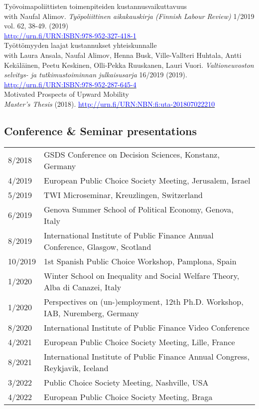 \documentclass[16pt]{article}
\begin{document}
\noindent Ty\"{o}voimapoliittisten toimenpiteiden kustannusvaikuttavuus \\
\noindent with Naufal Alimov. \textit{Ty\"{o}poliittinen aikakauskirja (Finnish Labour Review)} 1/2019 vol. 62, 38-49.  (2019) \\
\noindent \href{http://urn.fi/URN:ISBN:978-952-287-645-4}{\textcolor{blue}{http://urn.fi/URN:ISBN:978-952-327-418-1}} \\

\noindent Ty\"{o}tt\"{o}myyden laajat kustannukset yhteiskunnalle \\
\noindent with Laura Ansala, Naufal Alimov, Henna Busk, Ville-Vallteri Huhtala, Antti Kek\"{a}l\"{a}inen, Peetu Keskinen, Olli-Pekka Ruuskanen, Lauri Vuori.  \textit{Valtioneuvoston selvitys- ja tutkimustoiminnan julkaisusarja} 16/2019 (2019). \href{http://urn.fi/URN:ISBN:978-952-287-645-4}{\textcolor{blue}{http://urn.fi/URN:ISBN:978-952-287-645-4}} \\

\noindent Motivated Prospects of Upward Mobility \\
\noindent \textit{Master's Thesis} (2018). \href{http://urn.fi/URN:NBN:fi:uta-201807022210}{\textcolor{blue}{http://urn.fi/URN:NBN:fi:uta-201807022210}}



\subsection*{Conference \& Seminar presentations}
\begin{tabular}{@{}p{1.5in}p{5in}}
8/2018             & GSDS Conference on Decision Sciences, Konstanz, Germany\\
4/2019             & European Public Choice Society Meeting, Jerusalem, Israel\\
5/2019             & TWI Microseminar, Kreuzlingen, Switzerland \\
6/2019             & Genova Summer School of Political Economy, Genova, Italy \\
8/2019             & International Institute of Public Finance Annual Conference, Glasgow, Scotland \\
10/2019           & 1st Spanish Public Choice Workshop, Pamplona, Spain \\
1/2020             & Winter School on Inequality and Social Welfare Theory, Alba di Canazei, Italy \\
1/2020             & Perspectives on (un-)employment, 12th Ph.D. Workshop, IAB, Nuremberg, Germany \\
8/2020             & International Institute of Public Finance Video Conference \\
4/2021             & European Public Choice Society Meeting, Lille, France \\
8/2021             & International Institute of Public Finance Annual Congress, Reykjavik, Iceland \\
3/2022             & Public Choice Society Meeting, Nashville, USA \\
4/2022             & European Public Choice Society Meeting, Braga 
\end{tabular}
\end{document}
